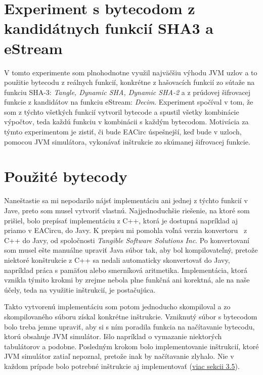 \section{Experiment s bytecodom z kandidátnych funkcií SHA3 a eStream}
\label{sec:exp2}

V tomto experimente som plnohodnotne využil najväčšiu výhodu JVM uzlov a to použitie bytecodu z reálnych funkcií,  konkrétne z hašovacích funkcií zo sútaže na funkciu SHA-3: \textit{Tangle, Dynamic SHA, Dynamic SHA-2} a z prúdovej šifrovacej funkcie z kandidátov na funkciu eStream: \textit{Decim}. Experiment spočíval v tom, že som z týchto všetkých funkcií vytvoril bytecode a spustil všetky kombinácie výpočtov, teda každú funkciu v kombinácii s každým bytecodom. Motivácia za týmto experimentom je zistiť, či bude EACirc úspešnejší, keď bude v uzloch, pomocou JVM simulátora, vykonávať inštrukcie zo skúmanej šifrovacej funkcie. 

\section{Použité bytecody}
\label{sec:exp2-bytecode}

Naneštastie sa mi nepodarilo nájsť implementáciu ani jednej z týchto funkcií v Jave, preto som musel vytvoriť vlastnú. Najjednoduchšie riešenie, na ktoré som prišiel, bolo prepísať implementáciu z C++, ktorá je dostupná napríklad aj priamo v EACircu, do Javy. K prepisu mi pomohla voľná verzia konvertoru~\parencite{c++-java-converter} z C++ do Javy, od spoločnosti \textit{Tangible Software Solutions Inc}. Po konvertovaní som musel ešte manuálne upraviť Java súbor tak, aby bol kompilovateľný, pretože niektoré konštrukcie z C++ sa nedali automaticky skonvertovať do Javy, napríklad práca s pamäťou alebo smerníková aritmetika. Implementácia, ktorá vznikla týmito krokmi by zrejme nebola plne funkčná ani korektná, ale na naše účely, teda na využitie inštrukcií, je postačujúca. 

Takto vytvorenú implementáciu som potom jednoducho skompiloval a zo skompilovaného súboru získal konkrétne inštrukcie. Vzniknutý súbor s bytecodom bolo treba jemne upraviť, aby si s ním poradila funkcia na načítavanie bytecodu, ktorú obsahuje JVM simulátor. Išlo napríklad o vymazanie niektorých tabulátorov a podobne. Posledným krokom bolo implementovanie inštrukcií, ktoré JVM simulátor zatiaľ nepoznal, pretože inak by načítavanie zlyhalo. Nie v každom prípade bolo potrebné inštrukcie aj implementovať (\hyperref[sec:impl-diff]{viac sekcii 3.5}).

